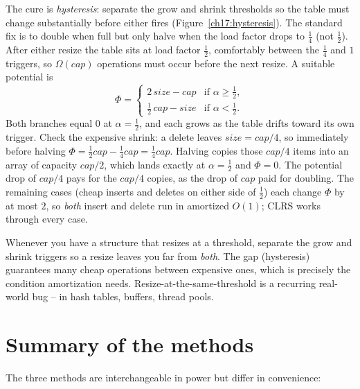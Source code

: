 The cure is \emph{hysteresis}: separate the grow and shrink thresholds so the table
must change substantially before either fires (Figure~\ref{ch17:hysteresis}). The standard fix is to double when
full but only halve when the load factor drops to $\tfrac14$ (not $\tfrac12$). After
either resize the table sits at load factor $\tfrac12$, comfortably between the
$\tfrac14$ and $1$ triggers, so $\Omega(\mathit{cap})$ operations must occur before
the next resize. A suitable potential is
\[
  \Phi =
  \begin{cases}
    2\,\mathit{size} - \mathit{cap} & \text{if } \alpha \ge \tfrac12,\\[2pt]
    \tfrac12\,\mathit{cap} - \mathit{size} & \text{if } \alpha < \tfrac12.
  \end{cases}
\]
Both branches equal $0$ at $\alpha = \tfrac12$, and each grows as the table drifts
toward its own trigger. Check the expensive shrink: a delete leaves
$\mathit{size} = \mathit{cap}/4$, so immediately before halving
$\Phi = \tfrac12\mathit{cap} - \tfrac14\mathit{cap} = \tfrac14\mathit{cap}$.
Halving copies those $\mathit{cap}/4$ items into an array of capacity
$\mathit{cap}/2$, which lands exactly at $\alpha = \tfrac12$ and $\Phi = 0$. The
potential drop of $\mathit{cap}/4$ pays for the $\mathit{cap}/4$ copies, as
the drop of $\mathit{cap}$ paid for doubling. The remaining cases (cheap inserts
and deletes on either side of $\tfrac12$) each change $\Phi$ by at most $2$, so
\emph{both} insert and delete run in amortized $O(1)$; CLRS works through every
case.

\begin{focusbox}
Whenever you have a structure that resizes at a threshold, separate the grow and
shrink triggers so a resize leaves you far from \emph{both}. The gap (hysteresis)
guarantees many cheap operations between expensive ones, which is precisely the
condition amortization needs. Resize-at-the-same-threshold is a recurring
real-world bug -- in hash tables, buffers, thread pools.
\end{focusbox}

\section{Summary of the methods}

The three methods are interchangeable in power but differ in convenience:


